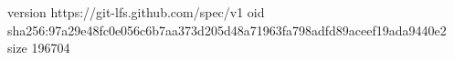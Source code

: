 version https://git-lfs.github.com/spec/v1
oid sha256:97a29e48fc0e056c6b7aa373d205d48a71963fa798adfd89aceef19ada9440e2
size 196704
